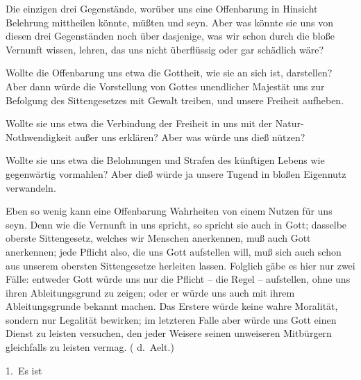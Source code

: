 \begin{aufza}
\item Die einzigen drei Gegenstände, worüber uns eine Offenbarung in  Hinsicht Belehrung mittheilen könnte, müßten  und  seyn. Aber was könnte sie uns von diesen drei Gegenständen noch über dasjenige, was wir schon durch die bloße Vernunft wissen, lehren, das uns nicht überflüssig oder gar schädlich wäre?
\begin{aufzb}
\item {} Wollte die Offenbarung uns etwa die Gottheit, wie sie an sich ist, darstellen? Aber dann würde die Vorstellung von Gottes unendlicher Majestät uns zur Befolgung des Sittengesetzes mit Gewalt treiben, und unsere Freiheit aufheben.
\item {} Wollte sie uns etwa die Verbindung der Freiheit in uns mit der Natur-Nothwendigkeit außer uns erklären? Aber was würde uns dieß nützen?
\item {} Wollte sie uns etwa die Belohnungen und Strafen des künftigen Lebens wie gegenwärtig vormahlen? Aber dieß würde ja unsere Tugend in bloßen Eigennutz verwandeln.
\end{aufzb}
\item Eben so wenig kann eine Offenbarung  Wahrheiten von einem Nutzen für uns seyn. Denn wie die Vernunft in uns spricht, so spricht sie auch in Gott; dasselbe oberste Sittengesetz, welches wir Menschen anerkennen, muß auch Gott anerkennen; jede Pflicht also, die uns Gott aufstellen will, muß sich auch schon aus unserem obersten Sittengesetze herleiten lassen. Folglich gäbe es hier nur zwei Fälle: entweder Gott würde uns nur die Pflicht -- die Regel -- aufstellen, ohne uns ihren Ableitungsgrund zu zeigen; oder er würde uns auch mit ihrem Ableitungsgrunde bekannt machen. Das Erstere würde keine wahre Moralität, sondern nur Legalität bewirken; im letzteren Falle aber würde uns Gott einen Dienst zu leisten versuchen, den jeder Weisere seinen unweiseren Mitbürgern gleichfalls zu leisten vermag. ( d.~Aelt.)
\end{aufza}\par
{} 1.~Es ist

